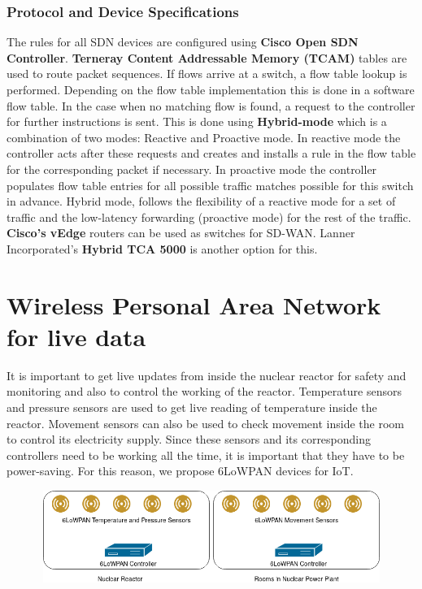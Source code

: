 \documentclass{article}
\begin{document}
\subsubsection{Protocol and Device Specifications}
The rules for all SDN devices are configured using \textbf{Cisco Open SDN Controller}. \textbf{Terneray Content Addressable Memory (TCAM)} tables are used to route packet sequences. If flows arrive at a switch, a flow table lookup is performed. Depending on the flow table implementation this is done in a software flow table. In the case when no matching flow is found, a request to the controller for further instructions is sent. This is done using \textbf{Hybrid-mode} which is a combination of two modes: Reactive and Proactive mode.  In reactive mode the controller acts after these requests and creates and installs a rule in the flow table for the corresponding packet if necessary. In proactive mode the controller populates flow table entries for all possible traffic matches possible for this switch in advance. Hybrid mode, follows the flexibility of a reactive mode for a set of traffic and the low-latency forwarding (proactive mode) for the rest of the traffic. \textbf{Cisco's vEdge} routers can be used as switches for SD-WAN. Lanner Incorporated's \textbf{Hybrid TCA 5000} is another option for this.
\section{Wireless Personal Area Network for live data}
It is important to get live updates from inside the nuclear reactor for safety and monitoring and also to control the working of the reactor. Temperature sensors and pressure sensors are used to get live reading of temperature inside the reactor. Movement sensors can also be used to check movement inside the room to control its electricity supply. Since these sensors and its corresponding controllers need to be working all the time, it is important that they have to be power-saving. For this reason, we propose 6LoWPAN devices for IoT.
\begin{figure}[htb]
	\centering
	\includegraphics[width=12cm,height=3cm]{wpan_design.png}
\end{figure}
\end{document}
